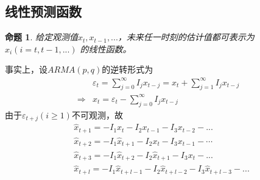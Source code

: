 \documentclass[12pt, a4paper, oneside]{ctexbook}
\newtheorem{proposition}[theorem]{命题}
\begin{document}
\subsection{线性预测函数}
\begin{proposition}
    给定观测值$x_t,x_{t-1},...$，未来任一时刻的估计值都可表示为$x_i(i = t, t-1,...)$
    的线性函数。
\end{proposition}
事实上，设$ARMA(p,q)$的逆转形式为
\begin{equation*}
    \begin{aligned}
                    & \varepsilon_t = \sum_{j=0}^{\infty}I_{j}x_{t-j}=x_t +\sum_{j=1}^{\infty}I_{j}x_{t-j} \\
        \Rightarrow & x_t = \varepsilon_t - \sum_{j=0}^{\infty}I_{j}x_{t-j}
    \end{aligned}
\end{equation*}
由于$\varepsilon_{t+j}(i\geq 1)$不可观测，故
\begin{equation*}
    \begin{aligned}
         & \hat{x}_{t+1}=-I_1x_t-I_2x_{t-1}-I_3x_{t-2}-...                                   \\
         & \hat{x}_{t+2}=-I_{1}\hat{x}_{t+1}-I_{2}x_{t}-I_{3}x_{t-1}-\cdots                  \\
         & \hat{x}_{t+3}=-I_{1}\hat{x}_{t+2}-I_{2}\hat{x}_{t+1}-I_{3}x_{t}-...               \\
         & \hat{x}_{t+l}=-I_{1}\hat{x}_{t+l-1}-I_{2}\hat{x}_{t+l-2}-I_{3}\hat{x}_{t+l-3}-...
    \end{aligned}
\end{equation*}
\end{document}
